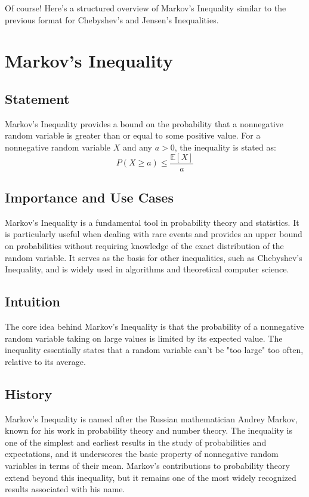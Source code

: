 \documentclass{article}
\begin{document}
Of course! Here's a structured overview of Markov's Inequality similar to the previous format for Chebyshev's and Jensen's Inequalities.

\section{Markov's Inequality}

\subsection{Statement}
Markov's Inequality provides a bound on the probability that a nonnegative random variable is greater than or equal to some positive value. For a nonnegative random variable \(X\) and any \(a > 0\), the inequality is stated as:
\[ P(X \geq a) \leq \frac{\mathbb{E}[X]}{a} \]

\subsection{Importance and Use Cases}
Markov's Inequality is a fundamental tool in probability theory and statistics. It is particularly useful when dealing with rare events and provides an upper bound on probabilities without requiring knowledge of the exact distribution of the random variable. It serves as the basis for other inequalities, such as Chebyshev's Inequality, and is widely used in algorithms and theoretical computer science.

\subsection{Intuition}
The core idea behind Markov's Inequality is that the probability of a nonnegative random variable taking on large values is limited by its expected value. The inequality essentially states that a random variable can't be "too large" too often, relative to its average.

\subsection{History}
Markov's Inequality is named after the Russian mathematician Andrey Markov, known for his work in probability theory and number theory. The inequality is one of the simplest and earliest results in the study of probabilities and expectations, and it underscores the basic property of nonnegative random variables in terms of their mean. Markov's contributions to probability theory extend beyond this inequality, but it remains one of the most widely recognized results associated with his name.
\end{document}
